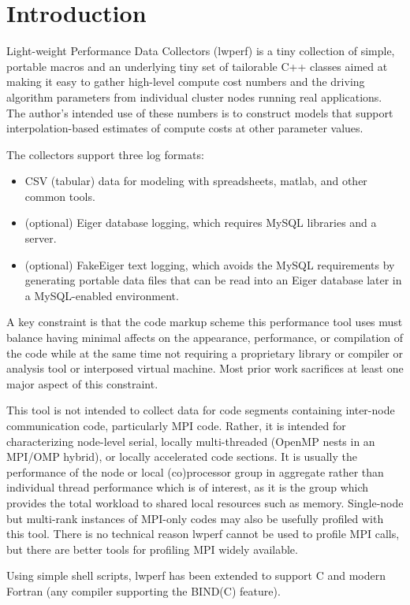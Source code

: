
\chapter{Introduction}\label{sec:over}
Light-weight Performance Data Collectors (lwperf) is a tiny collection of simple, portable macros and an underlying tiny set of tailorable C++ classes aimed at making it easy to gather high-level compute cost numbers and the driving algorithm parameters from individual cluster nodes running real applications. The author's intended use of these numbers is to construct models that support interpolation-based estimates of compute costs at other parameter values.

The collectors support three log formats:
\begin{itemize}
\item CSV (tabular) data for modeling with spreadsheets, matlab, and other common tools.
\item (optional) Eiger\cite{ref:eiger} database logging, which requires MySQL libraries and a server.
\item (optional) FakeEiger text logging, which avoids the MySQL requirements by generating portable data files that can be read into an Eiger database later in a MySQL-enabled environment.
\end{itemize}

A key constraint is that the code markup scheme this performance tool uses must balance having minimal affects on the appearance, performance, or compilation of the code while at the same time not requiring a proprietary library or compiler or analysis tool or interposed virtual machine. Most prior work sacrifices at least one major aspect of this constraint.

This tool is not intended to collect data for code segments containing inter-node communication code, particularly MPI code. Rather, it is intended for characterizing node-level serial, locally multi-threaded (OpenMP nests in an MPI/OMP hybrid), or locally accelerated code sections. It is usually the performance of the node or local (co)processor group in aggregate rather than individual thread performance which is of interest, as it is the group which provides the total workload to shared local resources such as memory. Single-node but multi-rank instances of MPI-only codes may also be usefully profiled with this tool. There is no technical reason lwperf cannot be used to profile MPI calls, but there are better tools for profiling MPI widely available.

Using simple shell scripts, lwperf has been extended to support C and modern Fortran (any compiler supporting the BIND(C) feature).


